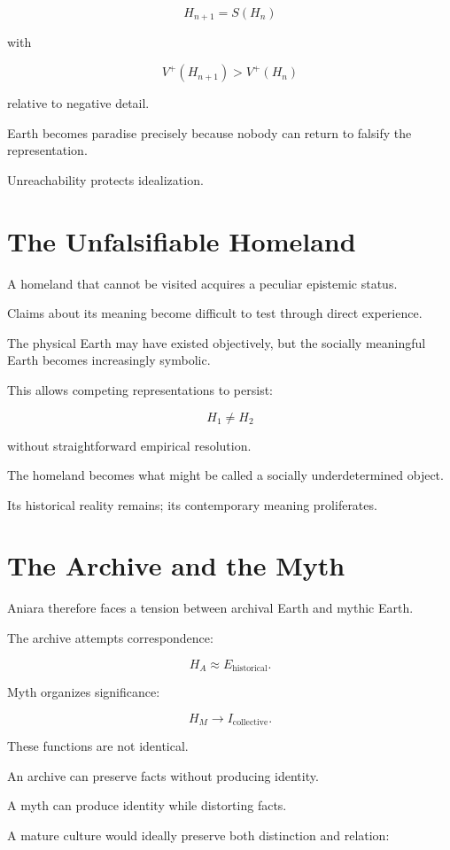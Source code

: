 \documentclass[11pt,oneside]{book}
\theoremstyle{definition}
\theoremstyle{remark}
\begin{document}
\[
H_{n+1}
=
S(H_n)
\]

with

\[
V^+(H_{n+1})
>
V^+(H_n)
\]

relative to negative detail.

Earth becomes paradise precisely because nobody can return to falsify the representation.

Unreachability protects idealization.

\section{The Unfalsifiable Homeland}

A homeland that cannot be visited acquires a peculiar epistemic status.

Claims about its meaning become difficult to test through direct experience.

The physical Earth may have existed objectively, but the socially meaningful Earth becomes increasingly symbolic.

This allows competing representations to persist:

\[
H_1\neq H_2
\]

without straightforward empirical resolution.

The homeland becomes what might be called a socially underdetermined object.

Its historical reality remains; its contemporary meaning proliferates.

\section{The Archive and the Myth}

Aniara therefore faces a tension between archival Earth and mythic Earth.

The archive attempts correspondence:

\[
H_A
\approx
E_{\mathrm{historical}}.
\]

Myth organizes significance:

\[
H_M
\rightarrow
I_{\mathrm{collective}}.
\]

These functions are not identical.

An archive can preserve facts without producing identity.

A myth can produce identity while distorting facts.

A mature culture would ideally preserve both distinction and relation:
\end{document}
